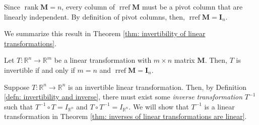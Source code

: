 \documentclass[]{book}
\DeclareMathOperator{\rref}{rref}
\DeclareMathOperator{\rank}{rank}
\newcommand{\inv}[1]{\ensuremath{{#1}^{-1}}}
\newcommand{\mat}[1]{\ensuremath{\mathbf{#1}}}
\newcommand{\idmat}[1][n]{\ensuremath{\mat{I}_#1}}
\newcommand{\R}{\ensuremath{\mathbb{R}}}
\begin{document}
Since $\rank \mat{M} = n$, every column of $\rref\mat{M}$ must be a pivot column that are linearly independent. By definition of pivot columns, then, $\rref \mat{M} = \idmat[n]$.

We summarize this result in Theorem \ref{thm: invertibility of linear transformations}.

\begin{theorem}
    \label{thm: invertibility of linear transformations}
    Let $T: \R^n \to \R^m$ be a linear transformation with $m \times n$ matrix $\mat{M}$. Then, $T$ is invertible if and only if $m=n$ and $\rref\mat{M} = \idmat[n]$. 
\end{theorem}

Suppose $T: \R^n \to \R^n$ is an invertible linear transformation. Then, by Definition \ref{defn: invertibility and inverse}, there must exist some \textit{inverse transformation} $\inv{T}$ such that $\inv{T} \circ T = I_{\R^n}$ and $T \circ \inv{T} = I_{\R^n}$. We will show that $\inv{T}$ is a linear transformation in Theorem \ref{thm: inverses of linear transformations are linear}.
\end{document}
